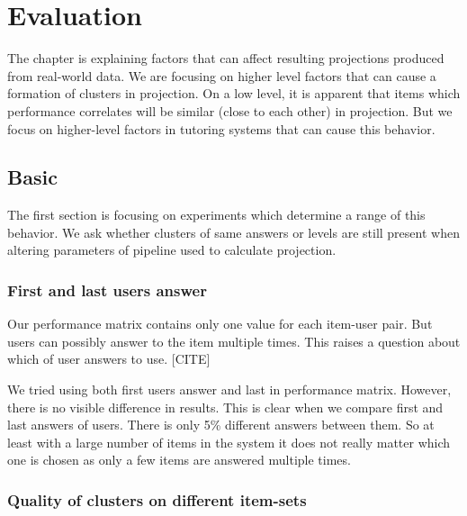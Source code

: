 \documentclass[
  digital, %
  table,   %
  nolof,     %
  nolot,     %
  nocover,
  color
]{fithesis3}
\begin{document}

\chapter{Evaluation}\label{evaluation}

The chapter is explaining factors that can affect resulting projections produced from real-world data. We are focusing on higher level factors that can cause a formation of clusters in projection. On a low level, it is apparent that items which performance correlates will be similar (close to each other) in projection. But we focus on higher-level factors in tutoring systems that can cause this behavior.

\section{Basic}\label{evaluation-basic}

The first section is focusing on experiments which determine a range of this behavior. We ask whether clusters of same answers or levels are still present when altering parameters of pipeline used to calculate projection.

\subsection{First and last users answer}\label{first-and-last-users-answer}


Our performance matrix contains only one value for each item-user pair. But users can possibly answer to the item multiple times. This raises a question about which of user answers to use. [CITE]


We tried using both first users answer and last in performance matrix. However, there is no visible difference in results. This is clear when we compare first and last answers of users. There is only 5\% different answers between them. So at least with a large number of items in the system it does not really matter which one is chosen as only a few items are answered multiple times.

\subsection{Quality of clusters on different item-sets}\label{quality-of-clusters}
\end{document}
